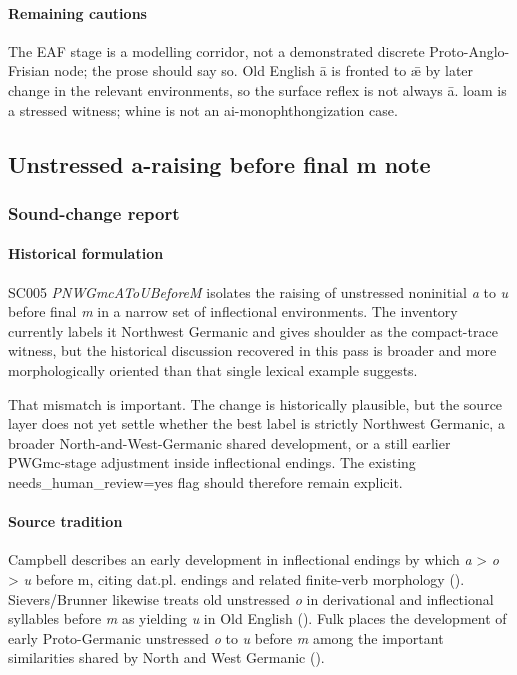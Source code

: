 \documentclass[
  british,
  a4paper,
]{article}
\begin{document}
\paragraph{Remaining cautions}\label{remaining-cautions-1}

The EAF stage is a modelling corridor, not a demonstrated discrete
Proto-Anglo-Frisian node; the prose should say so. Old English ā is
fronted to ǣ by later change in the relevant environments, so the
surface reflex is not always ā. loam is a stressed witness; whine is not
an ai-monophthongization case.

\subsection{Unstressed a-raising before final m
note}\label{unstressed-a-raising-before-final-m-note}

\subsubsection{Sound-change report}\label{sound-change-report-2}

\paragraph{Historical formulation}\label{historical-formulation-2}

SC005 \emph{PNWGmcAToUBeforeM} isolates the raising of unstressed
noninitial \emph{a} to \emph{u} before final \emph{m} in a narrow set of
inflectional environments. The inventory currently labels it Northwest
Germanic and gives shoulder as the compact-trace witness, but the
historical discussion recovered in this pass is broader and more
morphologically oriented than that single lexical example suggests.

That mismatch is important. The change is historically plausible, but
the source layer does not yet settle whether the best label is strictly
Northwest Germanic, a broader North-and-West-Germanic shared
development, or a still earlier PWGmc-stage adjustment inside
inflectional endings. The existing needs\_human\_review=yes flag should
therefore remain explicit.

\paragraph{Source tradition}\label{source-tradition-2}

Campbell describes an early development in inflectional endings by which
\emph{a} \textgreater{} \emph{o} \textgreater{} \emph{u} before m,
citing dat.pl. endings and related finite-verb morphology
().
Sievers/Brunner likewise treats old unstressed \emph{o} in derivational
and inflectional syllables before \emph{m} as yielding \emph{u} in Old
English ().
Fulk places the development of early Proto-Germanic unstressed \emph{o}
to \emph{u} before \emph{m} among the important similarities shared by
North and West Germanic ().
\end{document}

